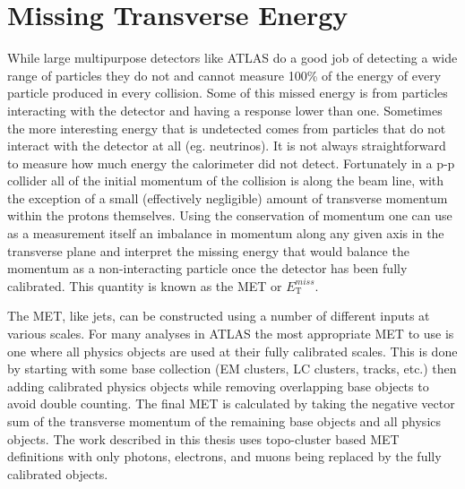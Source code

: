 \section{Missing Transverse Energy}
\label{Sec:MET}
While large multipurpose detectors like ATLAS do a good job of detecting a wide range of particles they do not and cannot measure 100\% of the energy of every particle produced in every collision.  
Some of this missed energy is from particles interacting with the detector and having a response lower than one.  
Sometimes the more interesting energy that is undetected comes from particles that do not interact with the detector at all (eg. neutrinos).  
It is not always straightforward to measure how much energy the calorimeter did not detect.  
Fortunately in a p-p collider all of the initial momentum of the collision is along the beam line, with the exception of a small (effectively negligible) amount of transverse momentum within the protons themselves.  
Using the conservation of momentum one can use as a measurement itself an imbalance in momentum along any given axis in the transverse plane and interpret the missing energy that would balance the momentum as a non-interacting particle once the detector has been fully calibrated.  
This quantity is known as the \gls{MET} or $E_{\mathrm T}^{miss}$.  


The MET, like jets, can be constructed using a number of different inputs at various scales.  
For many analyses in ATLAS the most appropriate MET to use is one where all physics objects are used at their fully calibrated scales.  
This is done by starting with some base collection (EM clusters, LC clusters, tracks, etc.) then adding calibrated physics objects while removing overlapping base objects to avoid double counting.  
The final MET is calculated by taking the negative vector sum of the transverse momentum of the remaining base objects and all physics objects.  
The work described in this thesis uses topo-cluster based MET definitions with only photons, electrons, and muons being replaced by the fully calibrated objects.  




